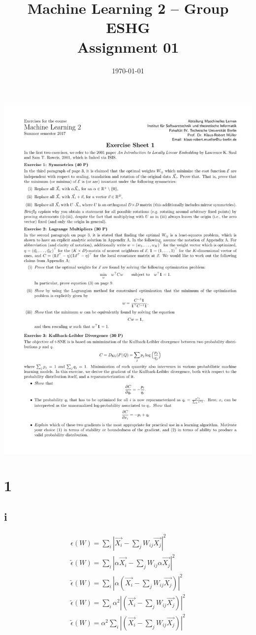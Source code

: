 \documentclass[11pt,a4paper]{article}
\title{Machine Learning 2 -- Group ESHG \\
        Assignment 01
}
\author{\students}
\date{\today}
\begin{document}
\maketitle

\includegraphics[clip, trim=0.5cm 0.5cm 0.5cm 5cm, width=1.00\textwidth]{sheet01.pdf}

\listoftodos
\clearpage

\section*{1}

\subsection*{i}

\begin{gather*}
\epsilon(W) = \sum_{i} |\vec{X_{i}} - \sum_j W_{ij} \vec{X_{j}}| ^{2} \\
\tilde{\epsilon}(W) = \sum_{i} |\alpha \vec{X_{i}} - \sum_j W_{ij} \alpha \vec{X_{j}}| ^{2} \\
\tilde{\epsilon}(W) = \sum_{i} |\alpha (\vec{X_{i}} - \sum_j W_{ij} \vec{X_{j}})| ^{2} \\
\tilde{\epsilon}(W) = \sum_{i} \alpha^2 |(\vec{X_{i}} - \sum_j W_{ij} \vec{X_{j}})| ^{2} \\
\tilde{\epsilon}(W) = \alpha^2 \sum_{i} |(\vec{X_{i}} - \sum_j W_{ij} \vec{X_{j}})| ^{2} \\
\end{gather*}
\end{document}
